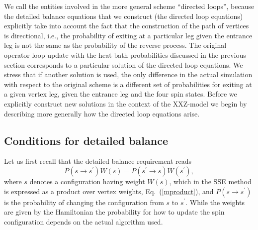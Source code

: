 \documentclass[10pt,pre,aps,twocolumn,showpacs,superscriptaddress,
floatfix]{revtex4}
\newcommand{\be}{\begin{equation}}
\newcommand{\ee}{\end{equation}}
\begin{document}
We call the entities involved in the more general scheme ``directed loops'', 
because the detailed balance equations that we construct (the directed loop
equations) explicitly take into account the fact that the construction of 
the path of vertices is directional, i.e., the probability of exiting at a 
particular leg given the entrance leg is not the same as the probability 
of the reverse process. The original operator-loop update with the heat-bath 
probabilities \cite{sse3} discussed in the previous section corresponds to a 
particular solution of the directed loop equations. We stress that if another
solution is used, the only difference in the actual simulation with respect 
to the original scheme is a different set of probabilities for exiting at a 
given vertex leg, given the entrance leg and the four spin states. Before we 
explicitly construct new solutions in the context of the XXZ-model we 
begin by describing more generally how the directed loop equations arise.

\subsection{Conditions for detailed balance}

Let us first recall that the detailed balance requirement reads
\be
	P(s \to s^\prime) W(s) = 
	P(s^\prime \to s) W(s^\prime),
\label{detbalance}
\ee
where $s$ denotes a configuration having weight $W(s)$, which in the SSE 
method is expressed as a product over vertex weights, Eq.~(\ref{mproduct}), 
and $P(s \to s^\prime)$ is the probability of changing the 
configuration from $s$ to $s^\prime$. While the weights are given by the 
Hamiltonian the probability for how to update the spin configuration 
depends on the actual algorithm used. 
\end{document}

